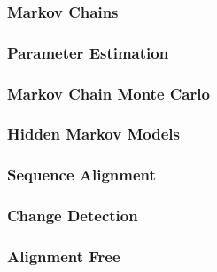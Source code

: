 \documentclass[12pt,a4paper]{article}
\begin{document}
            \subsubsection{Markov Chains}
            
            
            \subsubsection{Parameter Estimation}
            
            
            \subsubsection{Markov Chain Monte Carlo}
            
            
            \subsubsection{Hidden Markov Models}
             
            
            \subsubsection{Sequence Alignment}
            
            
            \subsubsection{Change Detection}
            
            
            
            \subsubsection{Alignment Free}
            
            
            
            
            
        
\end{document}
